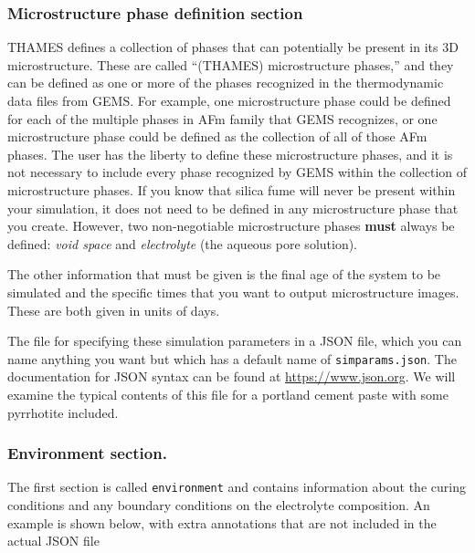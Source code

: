 \documentclass{article}
\begin{document}
\subsubsection{\label{sec:microphasedefs} Microstructure phase definition
	section}
THAMES defines a collection of phases that can potentially be present in its
3D microstructure. These are called ``(THAMES) microstructure phases,'' and
they can be defined as one or more of the phases recognized in the
thermodynamic data files from GEMS. For example, one microstructure phase
could be defined for each of the multiple phases in AFm family that
GEMS recognizes, or one microstructure phase could be defined as
the collection of all of those AFm phases. The user has the liberty to
define these microstructure phases, and it is not necessary to include
every phase recognized by GEMS within the collection of microstructure phases.
If you know that silica fume will never be present within your simulation,
it does not need to be defined in any microstructure phase that you create.
However, two non-negotiable microstructure phases \textbf{must} always be defined:
\textit{void space} and \textit{electrolyte} (the aqueous pore solution).

The other information that must be given is the final age of the system
to be simulated and the specific times that you want to output
microstructure images. These are both given in units of days.

The file for specifying these simulation parameters
in a JSON file, which you can name anything you want but which has a default
name of \verb!simparams.json!. The documentation for JSON syntax can be found at
\href{https://www.json.org}{https://www.json.org}.
We will examine the typical contents of this file for a portland
cement paste with some pyrrhotite included.

\subsubsection{\label{sec:envsection} Environment section.}
The first section is called \verb!environment! and contains
information about the curing conditions and any boundary conditions
on the electrolyte composition. An example is shown below, with
extra annotations that are not included in the actual JSON file
\end{document}
